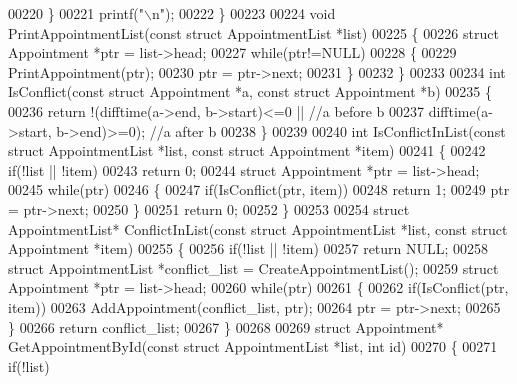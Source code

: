 \begin{DoxyCode}
{{{{{{{00220     \}
00221     printf(\textcolor{stringliteral}{"\(\backslash\)n"});
00222 \}
00223 
00224 \textcolor{keywordtype}{void} PrintAppointmentList(\textcolor{keyword}{const} \textcolor{keyword}{struct} AppointmentList *list)
00225 \{
00226     \textcolor{keyword}{struct }Appointment *ptr = list->head;
00227     \textcolor{keywordflow}{while}(ptr!=NULL)
00228     \{
00229         PrintAppointment(ptr);
00230         ptr = ptr->next;
00231     \}
00232 \}
00233 
00234 \textcolor{keywordtype}{int} IsConflict(\textcolor{keyword}{const} \textcolor{keyword}{struct} Appointment *a, \textcolor{keyword}{const} \textcolor{keyword}{struct} Appointment *b)
00235 \{
00236     \textcolor{keywordflow}{return} !(difftime(a->end, b->start)<=0 ||   \textcolor{comment}{//a before b}
00237         difftime(a->start, b->end)>=0);     \textcolor{comment}{//a after b}
00238 \}
00239 
00240 \textcolor{keywordtype}{int} IsConflictInList(\textcolor{keyword}{const} \textcolor{keyword}{struct} AppointmentList *list, \textcolor{keyword}{const} \textcolor{keyword}{struct} 
      Appointment *item)
00241 \{
00242     \textcolor{keywordflow}{if}(!list || !item)
00243         \textcolor{keywordflow}{return} 0;
00244     \textcolor{keyword}{struct }Appointment *ptr = list->head;
00245     \textcolor{keywordflow}{while}(ptr)
00246     \{
00247         \textcolor{keywordflow}{if}(IsConflict(ptr, item))
00248             \textcolor{keywordflow}{return} 1;
00249         ptr = ptr->next;
00250     \}
00251     \textcolor{keywordflow}{return} 0;
00252 \}
00253 
00254 \textcolor{keyword}{struct }AppointmentList* ConflictInList(\textcolor{keyword}{const} \textcolor{keyword}{struct} AppointmentList *list, \textcolor{keyword}{const} \textcolor{keyword}{struct} 
      Appointment *item)
00255 \{
00256     \textcolor{keywordflow}{if}(!list || !item)
00257         \textcolor{keywordflow}{return} NULL;
00258     \textcolor{keyword}{struct }AppointmentList *conflict\_list = CreateAppointmentList();
00259     \textcolor{keyword}{struct }Appointment *ptr = list->head;
00260     \textcolor{keywordflow}{while}(ptr)
00261     \{
00262         \textcolor{keywordflow}{if}(IsConflict(ptr, item))
00263             AddAppointment(conflict\_list, ptr);
00264         ptr = ptr->next;
00265     \}
00266     \textcolor{keywordflow}{return} conflict\_list;
00267 \}
00268 
00269 \textcolor{keyword}{struct }Appointment* GetAppointmentById(\textcolor{keyword}{const} \textcolor{keyword}{struct} AppointmentList *list, \textcolor{keywordtype}{int} \textcolor{keywordtype}{id})
00270 \{
00271     \textcolor{keywordflow}{if}(!list)
}}}}}}}
\end{DoxyCode}
